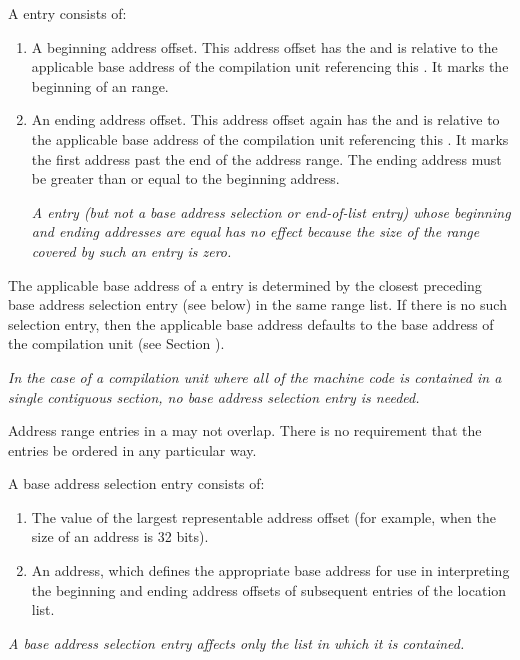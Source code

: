 A  entry consists of:
\begin{enumerate}[1. ]
\item A beginning address offset. This address offset has the 
 and is relative to
the applicable base address of the compilation unit referencing this 
. 
It marks the
beginning of an 
range.

\item An ending address offset. This address offset again has the 
 and is relative
to the applicable base address of the compilation unit referencing 
this .
It marks the
first address past the end of the address range.
The ending address must be greater than or
equal to the beginning address.

\textit{A  entry (but not a base address 
selection or end-of-list entry) whose beginning and
ending addresses are equal has no effect because the size of the 
range covered by such an entry is zero.}
\end{enumerate}

The applicable base address of a  entry
is determined
by the closest preceding base address selection entry (see
below) in the same range list. If there is no such selection
entry, then the applicable base address defaults to the base
address of the compilation unit 
(see Section ).

\textit{In the case of a compilation unit where all of the machine
code is contained in a single contiguous section, no base
address selection entry is needed.}

Address range entries in
a  may not overlap.
There is no requirement that
the entries be ordered in any particular way.

A base address selection entry consists of:
\begin{enumerate}[1. ]
\item The value of the largest representable address offset (for example, \wffffffff when the size of
an address is 32 bits).

\item An address, which defines the appropriate base address for use in interpreting the beginning
and ending address offsets of subsequent entries of the location list.
\end{enumerate}
\textit{A base address selection entry 
affects only the list in which it is contained.}



